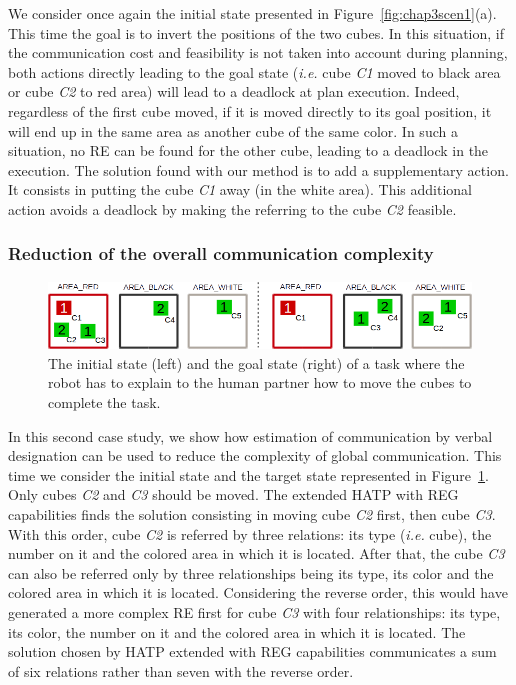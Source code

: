 \documentclass[a4paper,11pt,twoside]{StyleThese}
\begin{document}
We consider once again the initial state presented in Figure~\ref{fig:chap3scen1}(a). This time the goal is to invert the positions of the two cubes. In this situation, if the communication cost and feasibility is not taken into account during planning, both actions directly leading to the goal state (\textit{i.e.} cube \textit{C1} moved to black area or cube \textit{C2} to red area) will lead to a deadlock at plan execution. Indeed, regardless of the first cube moved, if it is moved directly to its goal position, it will end up in the same area as another cube of the same color. In such a situation, no RE can be found for the other cube, leading to a deadlock in the execution.
The solution found with our method is to add a supplementary action. It consists in putting the cube \textit{C1} away (in the white area). This additional action avoids a deadlock by making the referring to the cube \textit{C2} feasible.

\subsubsection{Reduction of the overall communication complexity}

\begin{figure}[t!]
\centering
\includegraphics[width=\textwidth]{figures/chapter3/setup2.png}
\caption{\label{fig:case2} The initial state (left) and the goal state (right) of a task where the robot has to explain to the human partner how to move the cubes to complete the task. }
\end{figure}

In this second case study, we show how estimation of communication by verbal designation can be used to reduce the complexity of global communication. This time we consider the initial state and the target state represented in Figure~\ref{fig:case2}. Only cubes \textit{C2} and \textit{C3} should be moved. The extended HATP with REG capabilities finds the solution consisting in moving cube \textit{C2} first, then cube \textit{C3}. With this order, cube \textit{C2} is referred by three relations: its type (\textit{i.e.} cube), the number on it and the colored area in which it is located. After that, the cube \textit{C3} can also be referred only by three relationships being its type, its color and the colored area in which it is located. Considering the reverse order, this would have generated a more complex RE first for cube \textit{C3} with four relationships: its type, its color, the number on it and the colored area in which it is located.
The solution chosen by HATP extended with REG capabilities communicates a sum of six relations rather than seven with the reverse order.
\end{document}
